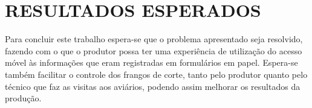 
\chapter{RESULTADOS ESPERADOS}

Para concluir este trabalho espera-se que o problema apresentado seja resolvido, fazendo com o que o produtor possa ter uma experiência de utilização do acesso móvel às informações que eram registradas em formulários em papel. Espera-se também facilitar o controle dos frangos de corte, tanto pelo produtor quanto pelo técnico que faz as visitas aos aviários, podendo assim melhorar os resultados da produção.